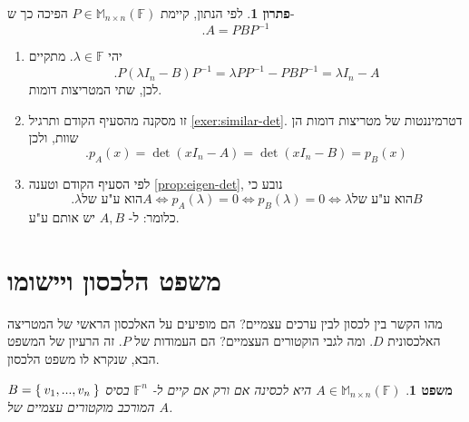 \documentclass[12pt]{report}
\theoremstyle{plain}
\newtheorem{theorem}{משפט}[chapter]
\theoremstyle{definition}
\newtheorem*{solution}{פתרון}
\newcommand{\F}{\mathbb{F}}
\newcommand{\M}{\mathbb{M}}
\newcommand{\0}{\mathbf{0}}
\begin{document}
\begin{solution}
לפי הנתון, קיימת 
$P\in\M_{n\times n}(\F)$
הפיכה כך ש-
$$
.A=PBP^{-1}
$$
\begin{enumerate}[label=\alph*.]
\item
יהי
$\lambda\in\F$.
מתקיים
$$
.P(\lambda I_n-B)P^{-1}=\lambda PP^{-1}-PBP^{-1}=\lambda I_n-A
$$
לכן, שתי המטריצות דומות.


\item 
זו מסקנה מהסעיף הקודם ותרגיל
\ref{exer:similar-det}.
דטרמיננטות של מטריצות דומות הן שוות, ולכן
$$
.p_A(x)=\det(xI_n-A)=\det(xI_n-B)=p_B(x)
$$


\item 
לפי הסעיף הקודם וטענה
\ref{prop:eigen-det},
נובע כי
$$
.\text{$\lambda$
הוא ע"ע של
$A$} \iff p_A(\lambda)=0 \iff p_B(\lambda)=0 \iff \text{$\lambda$
הוא ע"ע של
$B$}
$$
כלומר: ל-
$A,B$
יש אותם ע"ע.


\end{enumerate}
\end{solution}

\section{משפט הלכסון ויישומו}

מהו הקשר בין לכסון לבין ערכים עצמיים? הם מופיעים על האלכסון הראשי של המטריצה האלכסונית 
$D$.
ומה לגבי הוקטורים העצמיים? הם העמודות של
$P$.
זה הרעיון של המשפט הבא, שנקרא לו משפט הלכסון.

\begin{theorem}\label{thm:diag}
$A\in\M_{n\times n}(\F)$
היא לכסינה אם ורק אם קיים ל-
$\F^n$
בסיס
$B=\Set{v_1,...,v_n}$
המורכב מוקטורים עצמיים של 
$A$.
\end{theorem}
\end{document}
